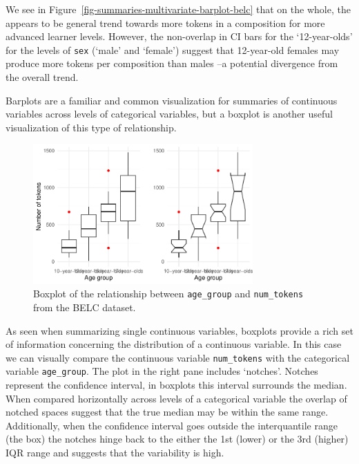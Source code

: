 \documentclass[
  letterpaper,
]{latex/krantz}
\begin{document}
We see in Figure~\ref{fig-summaries-multivariate-barplot-belc} that on
the whole, the appears to be general trend towards more tokens in a
composition for more advanced learner levels. However, the non-overlap
in CI bars for the `12-year-olds' for the levels of \texttt{sex} (`male'
and `female') suggest that 12-year-old females may produce more tokens
per composition than males --a potential divergence from the overall
trend.

Barplots are a familiar and common visualization for summaries of
continuous variables across levels of categorical variables, but a
boxplot is another useful visualization of this type of relationship.

\begin{figure}[h]

{\centering \includegraphics[width=0.75\textwidth,height=\textheight]{approaching-analysis_files/figure-pdf/fig-summaries-bivariate-boxplots-belc-1.pdf}

}

\caption{\label{fig-summaries-bivariate-boxplots-belc}Boxplot of the
relationship between \texttt{age\_group} and \texttt{num\_tokens} from
the BELC dataset.}

\end{figure}

As seen when summarizing single continuous variables, boxplots provide a
rich set of information concerning the distribution of a continuous
variable. In this case we can visually compare the continuous variable
\texttt{num\_tokens} with the categorical variable \texttt{age\_group}.
The plot in the right pane includes `notches'. Notches represent the
confidence interval, in boxplots this interval surrounds the median.
When compared horizontally across levels of a categorical variable the
overlap of notched spaces suggest that the true median may be within the
same range. Additionally, when the confidence interval goes outside the
interquantile range (the box) the notches hinge back to the either the
1st (lower) or the 3rd (higher) IQR range and suggests that the
variability is high.
\end{document}
